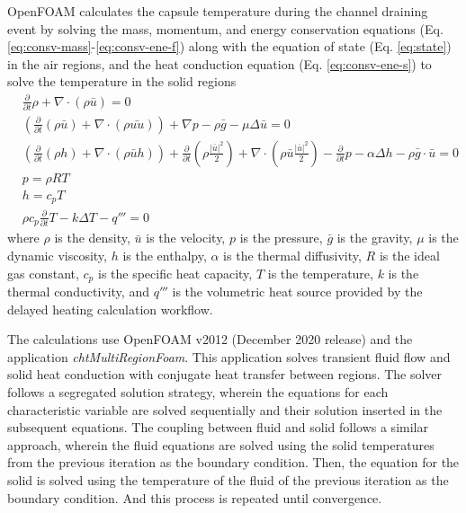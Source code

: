 OpenFOAM calculates the capsule temperature during the channel draining event by solving the mass, momentum, and energy conservation equations (Eq. \ref{eq:consv-mass}-\ref{eq:consv-ene-f}) along with the equation of state (Eq. \ref{eq:state}) in the air regions, and the heat conduction equation (Eq. \ref{eq:consv-ene-s}) to solve the temperature in the solid regions \cite{openfoam}
\begin{align}
& \frac{\partial}{\partial t} \rho + \nabla \cdot (\rho \bar{u}) = 0  \label{eq:consv-mass} \\
& \left( \frac{\partial}{\partial t} (\rho \bar{u}) + \nabla \cdot \left( \rho \bar{u u} \right) \right) + \nabla p - \rho \bar{g} - \mu \Delta \bar{u} = 0 \label{eq:consv-mom} \\
& \left( \frac{\partial}{\partial t} (\rho h) + \nabla \cdot \left( \rho \bar{u} h \right) \right) + \frac{\partial}{\partial t} \left( \rho \frac{|\bar{u}|^2}{2} \right) + \nabla \cdot \left( \rho \bar{u} \frac{|\bar{u}|^2}{2} \right) - \frac{\partial}{\partial t}p - \alpha \Delta h - \rho \bar{g} \cdot \bar{u} = 0 \label{eq:consv-ene-f} \\
& p = \rho R T \label{eq:state} \\
& h = c_p T \\
& \rho c_p \frac{\partial}{\partial t} T - k \Delta T - q''' = 0 \label{eq:consv-ene-s}
\end{align}
where $\rho$ is the density, $\bar{u}$ is the velocity, $p$ is the pressure, $\bar{g}$ is the gravity, $\mu$ is the dynamic viscosity, $h$ is the enthalpy, $\alpha$ is the thermal diffusivity, $R$ is the ideal gas constant, $c_p$ is the specific heat capacity, $T$ is the temperature, $k$ is the thermal conductivity, and $q'''$ is the volumetric heat source provided by the delayed heating calculation workflow.

The calculations use OpenFOAM v2012 (December 2020 release) and the application \textit{chtMultiRegionFoam}.
This application solves transient fluid flow and solid heat conduction with conjugate heat transfer between regions.
The solver follows a segregated solution strategy, wherein the equations for each characteristic variable are solved sequentially and their solution inserted in the subsequent equations.
The coupling between fluid and solid follows a similar approach, wherein the fluid equations are solved using the solid temperatures from the previous iteration as the boundary condition.
Then, the equation for the solid is solved using the temperature of the fluid of the previous iteration as the boundary condition.
And this process is repeated until convergence.

